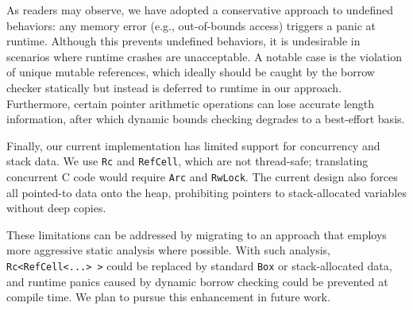 \documentclass{llncs} %
\begin{document}
As readers may observe, we have adopted a conservative approach to undefined behaviors: any memory error (e.g., out-of-bounds access) triggers a panic at runtime. Although this prevents undefined behaviors, it is undesirable in scenarios where runtime crashes are unacceptable. A notable case is the violation of unique mutable references, which ideally should be caught by the borrow checker statically but instead is deferred to runtime in our approach. Furthermore, certain pointer arithmetic operations can lose accurate length information, after which dynamic bounds checking degrades to a best-effort basis.

Finally, our current implementation has limited support for concurrency and stack data. We use \texttt{Rc} and \texttt{RefCell}, which are not thread-safe; translating concurrent C code would require \texttt{Arc} and \texttt{RwLock}. The current design also forces all pointed-to data onto the heap, prohibiting pointers to stack-allocated variables without deep copies.

These limitations can be addressed by migrating to an approach that employs more aggressive static analysis where possible. With such analysis, \texttt{Rc<RefCell<...> >} could be replaced by standard \texttt{Box} or stack-allocated data, and runtime panics caused by dynamic borrow checking could be prevented at compile time. We plan to pursue this enhancement in future work.
\end{document}
